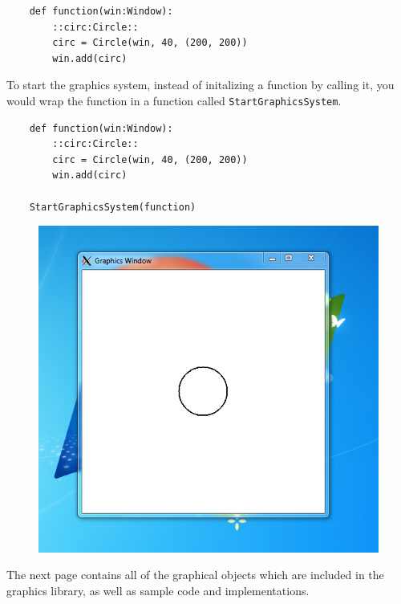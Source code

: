 \documentclass{article}
\begin{document}
\begin{verbatim}
    def function(win:Window):
        ::circ:Circle::
        circ = Circle(win, 40, (200, 200))
        win.add(circ)
\end{verbatim}

To start the graphics system, instead of initalizing a function by calling it, you would wrap the function in a function called \verb|StartGraphicsSystem|. 
\begin{verbatim}
    def function(win:Window):
        ::circ:Circle::
        circ = Circle(win, 40, (200, 200))
        win.add(circ)

    StartGraphicsSystem(function)
\end{verbatim}

\begin{figure}[h!]
\includegraphics[width=.5\textwidth]{circle}
\centering
{}
\end{figure}

The next page contains all of the graphical objects which are included in the graphics library, as well as sample code and implementations.
\end{document}
